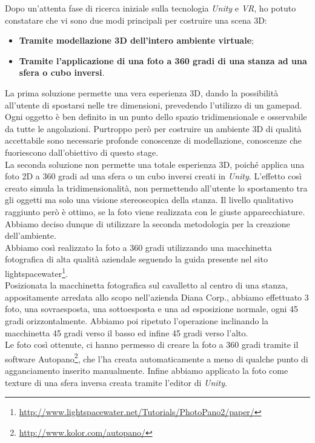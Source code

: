 Dopo un'attenta fase di ricerca iniziale sulla tecnologia \textit{Unity} e \textit{VR}, ho potuto constatare che vi sono due modi principali per costruire una scena 3D:

\begin{itemize}
	\item \textbf{Tramite modellazione 3D dell'intero ambiente virtuale};
	\item \textbf{Tramite l'applicazione di una foto a 360 gradi di una stanza ad una sfera o cubo inversi}.
\end{itemize}

La prima soluzione permette una vera esperienza 3D, dando la possibilità all'utente di spostarsi nelle tre dimensioni, prevedendo l'utilizzo di un gamepad. Ogni oggetto è ben definito in un punto dello spazio tridimensionale e osservabile da tutte le angolazioni. Purtroppo però per costruire un ambiente 3D di qualità accettabile sono necessarie profonde conoscenze di modellazione, conoscenze che fuoriescono dall'obiettivo di questo stage. \\
La seconda soluzione non permette una totale esperienza 3D, poiché applica una foto 2D a 360 gradi ad una sfera o un cubo inversi creati in \textit{Unity}. L'effetto così creato simula la tridimensionalità, non permettendo all'utente lo spostamento tra gli oggetti ma solo una visione stereoscopica della stanza. Il livello qualitativo raggiunto però è ottimo, se la foto viene realizzata con le giuste apparecchiature. Abbiamo deciso dunque di utilizzare la seconda metodologia per la creazione dell'ambiente. \\
Abbiamo così realizzato la foto a 360 gradi utilizzando una macchinetta fotografica di alta qualità aziendale seguendo la guida presente nel sito lightspacewater\footnote[2]{\url{http://www.lightspacewater.net/Tutorials/PhotoPano2/paper/}}. \\
Posizionata la macchinetta fotografica sul cavalletto al centro di una stanza, appositamente arredata allo scopo nell'azienda Diana Corp., abbiamo effettuato 3 foto, una sovraesposta, una sottoesposta e una ad esposizione normale, ogni 45 gradi orizzontalmente. Abbiamo poi ripetuto l'operazione inclinando la macchinetta 45 gradi verso il basso ed infine 45 gradi verso l'alto. \\ 
Le foto così ottenute, ci hanno permesso di creare la foto a 360 gradi tramite il software Autopano\footnote[3]{\url{http://www.kolor.com/autopano/}}, che l'ha creata automaticamente a meno di qualche punto di agganciamento inserito manualmente. Infine abbiamo applicato la foto come texture di una sfera inversa creata tramite l'editor di \textit{Unity}.


